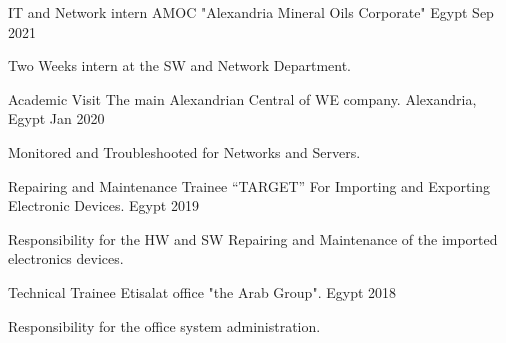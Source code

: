 \begin{cventries}

    \cventry
      {IT and Network intern } %
      {AMOC "Alexandria Mineral Oils Corporate"} %
      {Egypt} %
      {Sep 2021} %
      {
        \begin{cvitems} %
          \item {Two Weeks intern at the SW and Network Department.}
    \end{cvitems}
      }
  
  \end{cventries}
\begin{cventries}

    \cventry
      {Academic Visit} %
      {The main Alexandrian Central of WE company.} %
      {Alexandria, Egypt} %
      {Jan 2020} %
      {
        \begin{cvitems} %
          \item {Monitored and Troubleshooted for Networks and Servers.}
    \end{cvitems}
      }
  
  \end{cventries}
\begin{cventries}

    \cventry
      {Repairing and Maintenance Trainee} %
      {“TARGET” For Importing and Exporting Electronic Devices.} %
      {Egypt} %
      {2019} %
      {
        \begin{cvitems} %
          \item {Responsibility for the HW and SW Repairing and Maintenance of the imported electronics devices.}
    \end{cvitems}
      }
  \end{cventries}


\begin{cventries}

    \cventry
      {Technical Trainee} %
      {Etisalat office "the Arab Group".} %
      {Egypt} %
      {2018} %
      {
        \begin{cvitems} %
          \item {Responsibility for the office system administration.}
    \end{cvitems}
      }
  \end{cventries}


